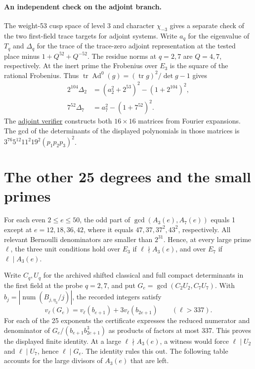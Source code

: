 \documentclass[11pt,a4paper]{article}
\newcommand{\tr}{\operatorname{tr}}
\newcommand{\num}{\operatorname{num}}
\begin{document}
\paragraph{An independent check on the adjoint branch.}
The weight-53 cusp space of level 3 and character \(\chi_{-3}\) gives
a separate check of the two first-field trace targets for adjoint systems.
Write \(a_q\) for the eigenvalue of \(T_q\) and \(\Delta_q\) for the trace
of the trace-zero adjoint representation at the tested place minus
\(1+Q^{52}+Q^{-52}\). The residue norms at \(q=2,7\) are \(Q=4,7\),
respectively. At the inert prime the Frobenius over \(E_3\) is the square
of the rational Frobenius. Thus \(\tr\operatorname{Ad}^0(g)=(\tr g)^2/\det g-1\)
gives
\[
\begin{aligned}
 2^{104}\Delta_2&=(a_2^2+2^{53})^2-(1+2^{104})^2,\\
 7^{52}\Delta_7&=a_7^2-(1+7^{52})^2 .
\end{aligned}
\]
The \href{https://github.com/leopintar05/hecke-k-theory-104/blob/v5/check_adjoint104.py}{adjoint verifier}
constructs both \(16\times16\) matrices from Fourier expansions. The gcd
of the determinants of the displayed polynomials in those matrices is
\(3^{76}5^{12}11^2 19^2(p_1p_2p_3)^2\).

\newpage
\section{The other 25 degrees and the small primes}
\label{sec:lower}
For each even \(2\le e\le50\), the odd part of
\(\gcd(A_3(e),A_7(e))\) equals 1 except at \(e=12,18,36,42\),
where it equals \(47,37,37^2,43^2\), respectively. All relevant
Bernoulli denominators are smaller than \(2^{31}\). Hence, at every large
prime \(\ell\), the three unit conditions hold over \(E_3\) if
\(\ell\nmid A_3(e)\), and over \(E_7\) if \(\ell\mid A_3(e)\).

Write \(C_q,U_q\) for the archived shifted classical and full compact
determinants in the first field at the probe \(q=2,7\), and put
\(G_e=\gcd(C_2U_2,C_7U_7)\). With
\(b_j=|\num(B_{j,\eta_3}/j)|\), the recorded integers satisfy
\[
 v_\ell(G_e)=v_\ell(b_{e+1})+3v_\ell(b_{2e+1})\qquad(\ell>337).
\]
For each of the 25 exponents the certificate expresses the reduced numerator
and denominator of \(G_e/(b_{e+1}b_{2e+1}^3)\) as products of factors
at most 337. This proves the displayed finite identity.
At a large \(\ell\nmid A_3(e)\), a witness would force
\(\ell\mid U_2\) and \(\ell\mid U_7\), hence \(\ell\mid G_e\).
The identity rules this out. The following table accounts for the
large divisors of \(A_3(e)\) that are left.
\end{document}
